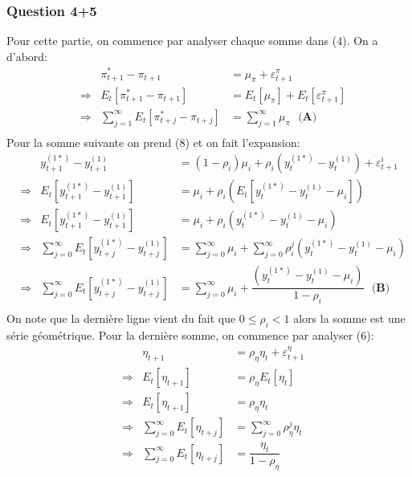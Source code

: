 \documentclass[letterpaper,11pt]{article}
\newcommand{\?}{\stackrel{?}{=}}
\let\epsilon\varepsilon
\newcommand{\macroA}[1]{y_{#1}^{(1*)}}
\newcommand{\macroB}[1]{y_{#1}^{(1)}}
\begin{document}
\subsubsection*{Question 4+5}
Pour cette partie, on commence par analyser chaque somme dans (4). On a d'abord:
\begin{equation*}
\begin{aligned}
    &&\pi_{t+1}^*-\pi_{t+1} &= \mu_{\pi}+\epsilon_{t+1}^{\pi} \\
    &\Rightarrow& E_t[\pi_{t+1}^*-\pi_{t+1}] &= E_t[\mu_{\pi}] + E_t[\epsilon_{t+1}^{\pi}]\\
    &\Rightarrow& \sum_{j=1}^{\infty}E_t[\pi_{t+j}^*-\pi_{t+j}] &= \sum_{j=1}^{\infty}\mu_{\pi} \ \ \ \textbf{(A)} \\
\end{aligned}
\end{equation*}
Pour la somme suivante on prend (8) et on fait l'expansion:
\begin{equation*}
\begin{aligned}
    &&\macroA{t+1}-\macroB{t+1} &= (1-\rho_i)\mu_i + \rho_i(\macroA{t}-\macroB{t})+\epsilon_{t+1}^i\\
    &\Rightarrow& E_t[\macroA{t+1}-\macroB{t+1}] &= \mu_i + \rho_i(E_t[\macroA{t}-\macroB{t}-\mu_i])\\
    &\Rightarrow& E_t[\macroA{t+1}-\macroB{t+1}] &= \mu_i + \rho_i(\macroA{t}-\macroB{t}-\mu_i)\\
    &\Rightarrow& \sum_{j=0}^{\infty}E_t[\macroA{t+j}-\macroB{t+j}] &= \sum_{j=0}^{\infty}\mu_i+\sum_{j=0}^{\infty}\rho_i^j(\macroA{t}-\macroB{t}-\mu_i)\\
    &\Rightarrow& \sum_{j=0}^{\infty}E_t[\macroA{t+j}-\macroB{t+j}] &= \sum_{j=0}^{\infty}\mu_i+\dfrac{(\macroA{t}-\macroB{t}-\mu_i)}{1-\rho_i} \ \ \ \textbf{(B)}\\
\end{aligned}
\end{equation*}
On note que la dernière ligne vient du fait que $0\leq\rho_i<1$ alors la somme est une série géométrique.
Pour la dernière somme, on commence par analyser (6):
\begin{equation*}
\begin{aligned}
    &&\eta_{t+1} &= \rho_{\eta}\eta_t+\epsilon_{t+1}^{\eta} \\
    &\Rightarrow& E_t[\eta_{t+1}] &= \rho_{\eta}E_t[\eta_t] \\
    &\Rightarrow& E_t[\eta_{t+1}] &= \rho_{\eta}\eta_t\\
    &\Rightarrow& \sum_{j=0}^{\infty}E_t[\eta_{t+j}] &= \sum_{j=0}^{\infty}\rho_{\eta}^j\eta_t\\
    &\Rightarrow& \sum_{j=0}^{\infty}E_t[\eta_{t+j}] &= \dfrac{\eta_t}{1-\rho_{\eta}}
\end{aligned}
\end{equation*}
\end{document}

